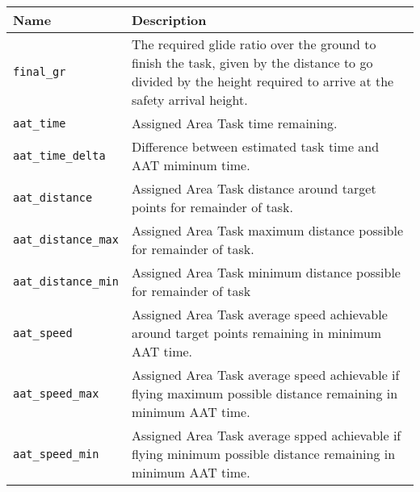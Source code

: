\begin{maxipage}
\begin{tabularx}{1.9\textwidth}{l|X}
Name & Description \\
\hline\hline

\verb|final_gr| & The required glide ratio over the ground to finish
the task, given by \newline the distance to go divided by the height
required to arrive at the safety \newline arrival height. \\

\hline

\verb|aat_time| & Assigned Area Task time remaining. \\

\hline

\verb|aat_time_delta| & Difference between estimated task time and
AAT miminum time.\\

\hline

\verb|aat_distance| & Assigned Area Task distance around target points
for remainder of \newline task. \\

\hline

\verb|aat_distance_max| & Assigned Area Task maximum distance possible
for remainder of \newline task. \\

\hline

\verb|aat_distance_min| & Assigned Area Task minimum distance possible
for remainder of  \newline task\\

\hline

\verb|aat_speed| & Assigned Area Task average speed achievable around
target points \newline remaining in minimum AAT time. \\

\hline

\verb|aat_speed_max| & Assigned Area Task average speed achievable
if flying maximum \newline possible distance remaining in minimum
AAT time. \\

\hline

\verb|aat_speed_min| & Assigned Area Task average spped achievable
if flying minimum \newline possible distance remaining in minimum
AAT time.  \\


\end{tabularx}
\end{maxipage}
